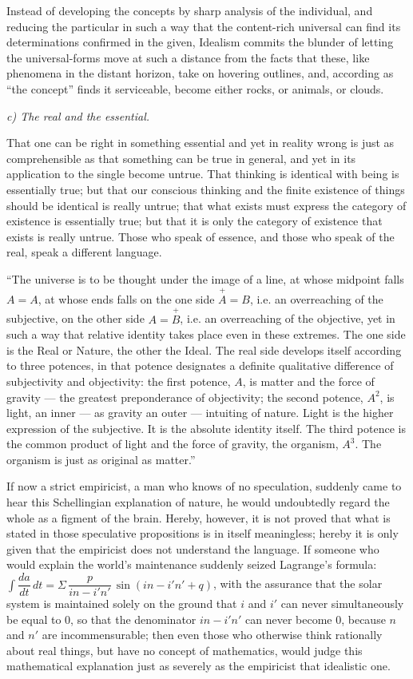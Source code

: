 \documentclass[12pt]{book}
\begin{document}
Instead of developing the concepts by sharp analysis of the individual, and
reducing the particular in such a way that the content-rich universal can find its
determinations confirmed in the given, Idealism commits the blunder of letting the
universal-forms move at such a distance from the facts that these, like phenomena
in the distant horizon, take on hovering outlines, and, according as ``the
concept'' finds it serviceable, become either rocks, or animals, or clouds.

\emph{c) The real and the essential.}

That one can be right in something essential and yet in reality wrong is just as
comprehensible as that something can be true in general, and yet in its
application to the single become untrue. That thinking is identical with being is
essentially true; but that our conscious thinking and the finite existence of
things should be identical is really untrue; that what exists must express the
category of existence is essentially true; but that it is only the category of
existence that exists is really untrue. Those who speak of essence, and those who
speak of the real, speak a different language.

``The universe is to be thought under the image of a line, at whose midpoint falls
$A = A$, at whose ends falls on the one side $\overset{+}{A} = B$, i.e. an
overreaching of the subjective, on the other side $A = \overset{+}{B}$, i.e. an
overreaching of the objective, yet in such a way that relative identity takes place
even in these extremes. The one side is the Real or Nature, the other the Ideal.
The real side develops itself according to three potences, in that potence
designates a definite qualitative difference of subjectivity and objectivity: the
first potence, $A$, is matter and the force of gravity — the greatest preponderance
of objectivity; the second potence, $A^2$, is light, an inner — as gravity an
outer — intuiting of nature. Light is the higher expression of the subjective. It
is the absolute identity itself. The third potence is the common product of light
and the force of gravity, the organism, $A^3$. The organism is just as original as
matter.''

If now a strict empiricist, a man who knows of no speculation, suddenly came to
hear this Schellingian explanation of nature, he would undoubtedly regard the whole
as a figment of the brain. Hereby, however, it is not proved that what is stated in
those speculative propositions is in itself meaningless; hereby it is only given
that the empiricist does not understand the language. If someone who would explain
the world's maintenance suddenly seized Lagrange's
formula: $\int \dfrac{da}{dt}\,dt = \Sigma\,\dfrac{p}{in-i'n'}\,\sin(in-i'n'+q)$,
with the assurance that the solar system is maintained solely on the ground that
$i$ and $i'$ can never simultaneously be equal to $0$, so that the denominator
$in-i'n'$ can never become $0$, because $n$ and $n'$ are incommensurable; then even
those who otherwise think rationally about real things, but have no concept of
mathematics, would judge this mathematical explanation just as severely as the
empiricist that idealistic one.
\end{document}
